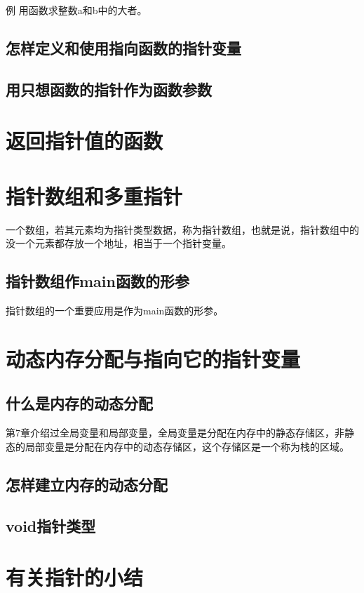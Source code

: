 例 用函数求整数a和b中的大者。
\subsection{怎样定义和使用指向函数的指针变量}
\subsection{用只想函数的指针作为函数参数}
\section{返回指针值的函数}
\section{指针数组和多重指针}
一个数组，若其元素均为指针类型数据，称为指针数组，也就是说，指针数组中的没一个元素都存放一个地址，相当于一个指针变量。
\subsection{指针数组作main函数的形参}
指针数组的一个重要应用是作为main函数的形参。
\section{动态内存分配与指向它的指针变量}
\subsection{什么是内存的动态分配}
第7章介绍过全局变量和局部变量，全局变量是分配在内存中的静态存储区，非静态的局部变量是分配在内存中的动态存储区，这个存储区是一个称为栈的区域。
\subsection{怎样建立内存的动态分配}
\subsection{void指针类型}
\section{有关指针的小结}
